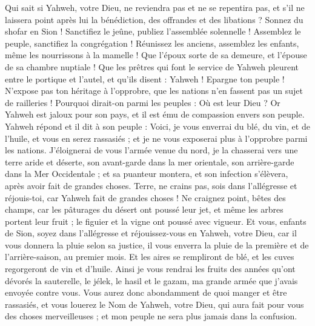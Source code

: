 \begin{multicols}{2}
Qui sait si Yahweh, votre Dieu, ne reviendra pas et ne se repentira pas, et s'il ne laissera point après lui la bénédiction, des offrandes et des libations ?
Sonnez du shofar en Sion ! Sanctifiez le jeûne, publiez l'assemblée solennelle !
Assemblez le peuple, sanctifiez la congrégation ! Réunissez les anciens, assemblez les enfants, même les nourrissons à la mamelle ! Que l'époux sorte de sa demeure, et l'épouse de sa chambre nuptiale !
Que les prêtres qui font le service de Yahweh pleurent entre le portique et l'autel, et qu'ils disent : Yahweh ! Epargne ton peuple ! N'expose pas ton héritage à l'opprobre, que les nations n'en fassent pas un sujet de railleries ! Pourquoi dirait-on parmi les peuples : Où est leur Dieu ?
Or Yahweh est jaloux pour son pays, et il est ému de compassion envers son peuple.
Yahweh répond et il dit à son peuple : Voici, je vous enverrai du blé, du vin, et de l'huile, et vous en serez rassasiés ; et je ne vous exposerai plus à l'opprobre parmi les nations.
J'éloignerai de vous l'armée venue du nord, je la chasserai vers une terre aride et déserte, son avant-garde dans la mer orientale, son arrière-garde dans la Mer Occidentale ; et sa puanteur montera, et son infection s'élèvera, après avoir fait de grandes choses.
Terre, ne crains pas, sois dans l'allégresse et réjouis-toi, car Yahweh fait de grandes choses !
Ne craignez point, bêtes des champs, car les pâturages du désert ont poussé leur jet, et même les arbres portent leur fruit ; le figuier et la vigne ont poussé avec vigueur.
Et vous, enfants de Sion, soyez dans l'allégresse et réjouissez-vous en Yahweh, votre Dieu, car il vous donnera la pluie selon sa justice, il vous enverra la pluie de la première et de l'arrière-saison, au premier mois.
Et les aires se rempliront de blé, et les cuves regorgeront de vin et d'huile.
Ainsi je vous rendrai les fruits des années qu'ont dévorés la sauterelle, le jélek, le hasil et le gazam, ma grande armée que j'avais envoyée contre vous.
Vous aurez donc abondamment de quoi manger et être rassasiés, et vous louerez le Nom de Yahweh, votre Dieu, qui aura fait pour vous des choses merveilleuses ; et mon peuple ne sera plus jamais dans la confusion.

\end{multicols}
